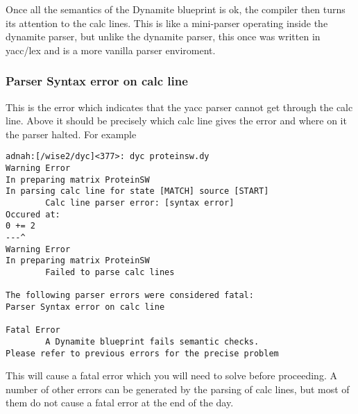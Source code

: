 Once all the semantics of the Dynamite blueprint is ok, the compiler then turns its
attention to the calc lines. This is like a mini-parser operating inside the dynamite
parser, but unlike the dynamite parser, this once was written in yacc/lex and is
a more vanilla parser enviroment.

\subsubsection{Parser Syntax error on calc line}

This is the error which indicates that the yacc parser cannot get through the calc
line. Above it should be precisely which calc line gives the error and where on
it the parser halted. For example

\begin{verbatim}
adnah:[/wise2/dyc]<377>: dyc proteinsw.dy
Warning Error
In preparing matrix ProteinSW
In parsing calc line for state [MATCH] source [START]
        Calc line parser error: [syntax error]
Occured at:
0 += 2
---^
Warning Error
In preparing matrix ProteinSW
        Failed to parse calc lines

The following parser errors were considered fatal:
Parser Syntax error on calc line

Fatal Error
        A Dynamite blueprint fails semantic checks. 
Please refer to previous errors for the precise problem
\end{verbatim}

This will cause a fatal error which you will need to solve before proceeding. A number
of other errors can be generated by the parsing of calc lines, but most of them do not
cause a fatal error at the end of the day.















